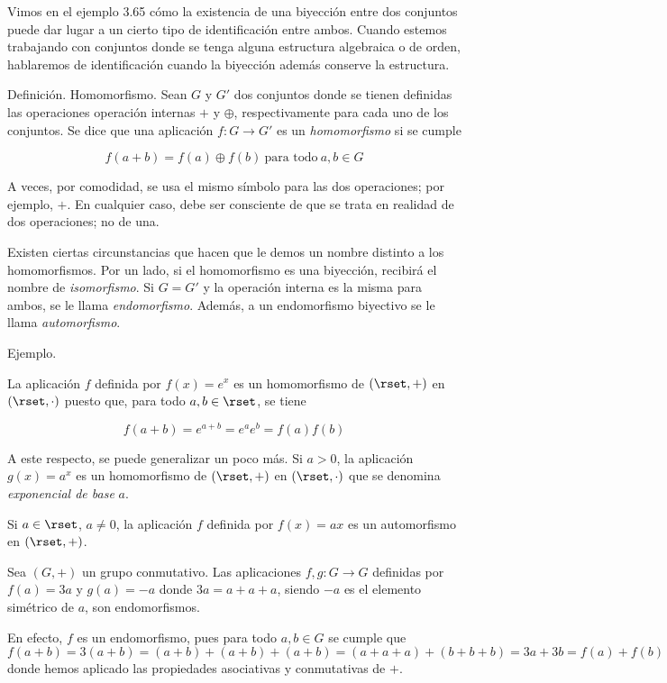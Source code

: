 

Vimos en el ejemplo 3.65 cómo la existencia de una biyección entre dos
conjuntos puede dar lugar a un cierto tipo de identificación entre ambos.
Cuando estemos trabajando con conjuntos donde se tenga alguna estructura
algebraica o de orden, hablaremos de identificación cuando la biyección
además conserve la estructura.

Definición. Homomorfismo. Sean $G$ y $G'$ dos conjuntos donde se tienen
definidas las operaciones operación internas $+$ y $\oplus$, respectivamente
para cada uno de los conjuntos. Se dice que una aplicación $f: G
\longrightarrow G'$ es un \emph{homomorfismo} si se cumple

$$ f(a + b) = f(a) \oplus f(b) \ \text{para todo} \ a, b \in G $$

\noindent A veces, por comodidad, se usa el mismo símbolo para las dos
operaciones; por ejemplo, $+$. En cualquier caso, debe ser consciente de que
se trata en realidad de dos operaciones; no de una.

Existen ciertas circunstancias que hacen que le demos un nombre distinto a
los homomorfismos. Por un lado, si el homomorfismo es una biyección,
recibirá el nombre de \emph{isomorfismo}. Si $G = G'$ y la operación interna
es la misma para ambos, se le llama \emph{endomorfismo}. Además, a un
endomorfismo biyectivo se le llama \emph{automorfismo}.

Ejemplo.

La aplicación $f$ definida por $f(x) = e^x$ es un homomorfismo de $(\rset,
+)$ en $(\rset, \cdot)$ puesto que, para todo $a, b \in \rset$, se tiene

$$ f(a+b) = e^{a+b} = e^a e^b = f(a)f(b) $$

\noindent A este respecto, se puede generalizar un poco más. Si $a > 0$, la
aplicación $g(x) = a^x$ es un homomorfismo de $(\rset, +)$ en $(\rset,
\cdot)$ que se denomina \emph{exponencial de base} $a$.

Si $a \in \rset$, $a \neq 0$, la aplicación $f$ definida por $f(x) = ax$ es
un automorfismo en $(\rset, +)$.

Sea $(G, +)$ un grupo conmutativo. Las aplicaciones $f, g: G \longrightarrow
G$ definidas por $f(a) = 3a$ y $g(a) = {-a}$ donde $3a = a + a + a$, siendo
${-a}$ es el elemento simétrico de $a$, son endomorfismos.

En efecto, $f$ es un endomorfismo, pues para todo $a, b \in G$ se cumple que
$f(a + b) = 3(a + b) = (a + b) + (a + b) + (a + b) = (a + a + a) + (b + b +
b) = 3a + 3b = f(a) + f(b)$ donde hemos aplicado las propiedades asociativas
y conmutativas de $+$.

